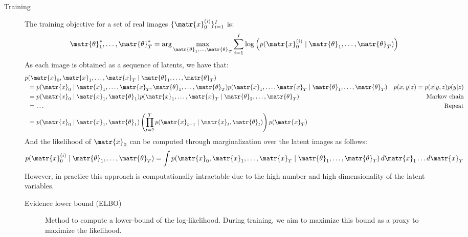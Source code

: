 \begin{description}
        \begin{description}
            \item[Training]
                The training objective for a set of real images $\{ \matr{x}_0^{(i)} \}_{i=1}^{I}$ is:
                \[ \matr{\theta}_1^*, \dots, \matr{\theta}_T^* = \arg\max_{\matr{\theta}_1, \dots, \matr{\theta}_T} \sum_{i=1}^{I} \log\left( p(\matr{x}_0^{(i)} \mid \matr{\theta}_1, \dots, \matr{\theta}_T) \right) \]
                As each image is obtained as a sequence of latents, we have that:
                \[
                    \begin{aligned}
                        p&(\matr{x}_0, \matr{x}_1, \dots, \matr{x}_T \mid \matr{\theta}_1, \dots, \matr{\theta}_T) \\
                        &= p(\matr{x}_0 \mid \matr{x}_1, \dots, \matr{x}_T, \matr{\theta}_1, \dots, \matr{\theta}_T) p(\matr{x}_1, \dots, \matr{x}_T \mid \matr{\theta}_1, \dots, \matr{\theta}_T) 
                            & p(x, y | z) = p(x | y, z)p(y | z) \\
                        &= p(\matr{x}_0 \mid \matr{x}_1, \matr{\theta}_1) p(\matr{x}_1, \dots, \matr{x}_T \mid \matr{\theta}_2, \dots, \matr{\theta}_T) 
                            & \text{Markov chain} \\
                        &= \dots & \text{Repeat} \\
                        &= p(\matr{x}_0 \mid \matr{x}_1, \matr{\theta}_1) \left( \prod_{t=2}^{T} p(\matr{x}_{t-1} \mid \matr{x}_t, \matr{\theta}_t) \right) p(\matr{x}_T)
                    \end{aligned}
                \]
                And the likelihood of $\matr{x}_0$ can be computed through marginalization over the latent images as follows:
                \[ p(\matr{x}_0^{(i)} \mid \matr{\theta}_1, \dots, \matr{\theta}_T) = \int p(\matr{x}_0, \matr{x}_1, \dots, \matr{x}_T \mid \matr{\theta}_1, \dots, \matr{\theta}_T) \, d\matr{x}_1 \dots d\matr{x}_T \]
                However, in practice this approach is computationally intractable due to the high number and high dimensionality of the latent variables.

                \begin{description}
                    \item[Evidence lower bound (ELBO)] 
                        Method to compute a lower-bound of the log-likelihood. During training, we aim to maximize this bound as a proxy to maximize the likelihood.


\end{description}
\end{description}
\end{description}
